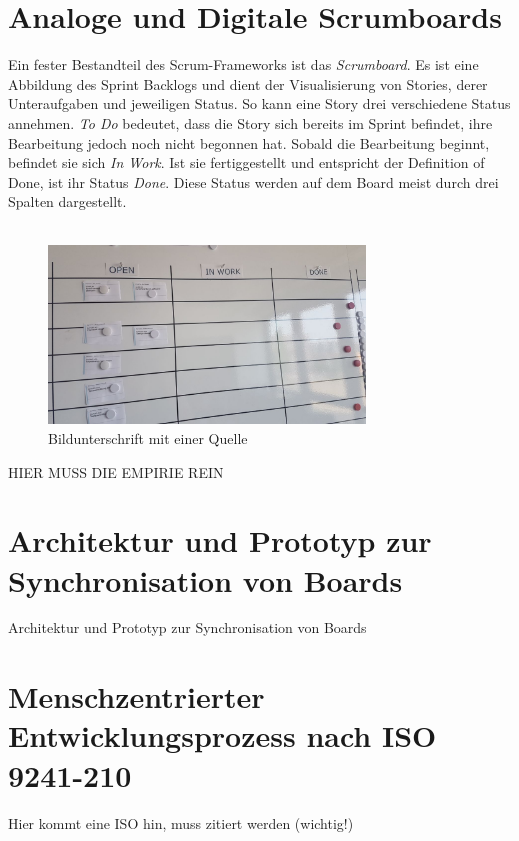\section{Analoge und Digitale Scrumboards}
\label{sec:digitale_analoge_boards}
Ein fester Bestandteil des Scrum-Frameworks ist das \textit{Scrumboard}. Es ist eine Abbildung des Sprint Backlogs und dient der Visualisierung von Stories, derer Unteraufgaben und jeweiligen Status. So kann eine Story drei verschiedene Status annehmen. \textit{To Do} bedeutet, dass die Story sich bereits im Sprint befindet, ihre Bearbeitung jedoch noch nicht begonnen hat. Sobald die Bearbeitung beginnt, befindet sie sich \textit{In Work}. Ist sie fertiggestellt und entspricht der Definition of Done, ist ihr Status \textit{Done}. Diese Status werden auf dem Board meist durch drei Spalten dargestellt. 
\\ \\
\begin{figure}[!ht]
	\centering
		\includegraphics[width=0.75\textwidth]{images/physicalBoardNear.jpg}
	\caption{Bildunterschrift mit einer Quelle}
	\label{fig:box}
\end{figure}

HIER MUSS DIE EMPIRIE REIN

\section{Architektur und Prototyp zur Synchronisation von Boards}
\label{sec:architektur_prototyp_sync}

Architektur und Prototyp zur Synchronisation von Boards

\section{Menschzentrierter Entwicklungsprozess nach ISO 9241-210}
\label{sec:menschzentrierte_entwicklung_iso9241}

Hier kommt eine ISO hin, muss zitiert werden (wichtig!)
